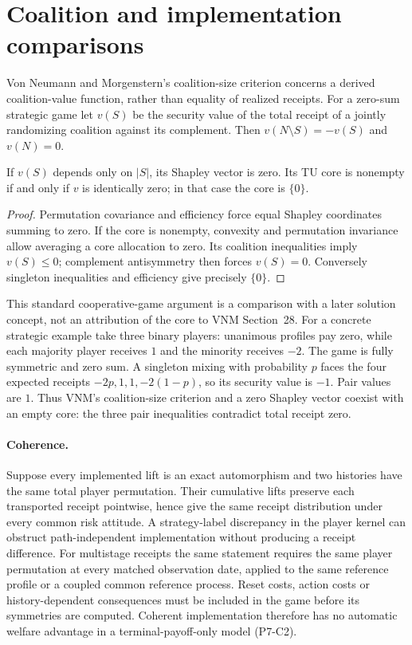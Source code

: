 \section{Coalition and implementation comparisons}
Von Neumann and Morgenstern's coalition-size criterion concerns a derived
coalition-value function, rather than equality of realized receipts.
For a zero-sum strategic game let $v(S)$ be the security value of the total
receipt of a jointly randomizing coalition against its complement. Then
$v(N\setminus S)=-v(S)$ and $v(N)=0$.

\begin{proposition}[P7-C1]
If $v(S)$ depends only on $|S|$, its Shapley vector is zero. Its TU core is
nonempty if and only if $v$ is identically zero; in that case the core is
$\{0\}$.
\end{proposition}
\begin{proof}
Permutation covariance and efficiency force equal Shapley coordinates
summing to zero. If the core is nonempty, convexity and permutation invariance
allow averaging a core allocation to zero. Its coalition inequalities imply
$v(S)\le0$; complement antisymmetry then forces $v(S)=0$.
Conversely singleton inequalities and efficiency give precisely $\{0\}$.
\end{proof}
This standard cooperative-game argument is a comparison with a later
solution concept, not an attribution of the core to VNM Section~28.
For a concrete strategic example take three binary players: unanimous
profiles pay zero, while each majority player receives $1$ and the minority
receives $-2$. The game is fully symmetric and zero sum. A singleton mixing
with probability $p$ faces the four expected receipts
$-2p,1,1,-2(1-p)$, so its security value is $-1$. Pair values are $1$.
Thus VNM's coalition-size criterion and a zero Shapley vector coexist with
an empty core: the three pair inequalities contradict total receipt zero.

\paragraph{Coherence.}
Suppose every implemented lift is an exact automorphism and two histories
have the same total player permutation. Their cumulative lifts preserve
each transported receipt pointwise, hence give the same receipt distribution
under every common risk attitude. A strategy-label discrepancy in the player kernel can obstruct
path-independent implementation without producing a receipt difference.
For multistage receipts the same statement requires the same player
permutation at every matched observation date, applied to the same reference profile
or a coupled common reference process. Reset costs, action costs or
history-dependent consequences must be included in the game before its
symmetries are computed. Coherent implementation therefore has no automatic
welfare advantage in a terminal-payoff-only model (P7-C2).
